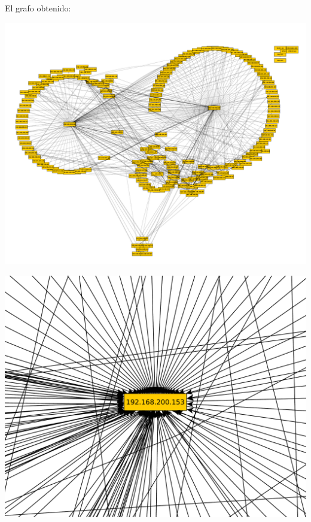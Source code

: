 \indent El grafo obtenido:\\
\begin{center}
\includegraphics[scale=0.5,clip=true,trim=20 0 0 0]{graphics/laburomediano.pdf}

\includegraphics[scale=0.3,clip=true,trim=20 0 0 0]{graphics/laburomediano153.pdf}


\end{center}
